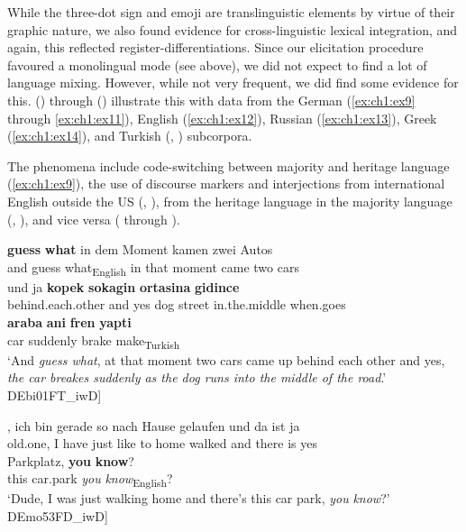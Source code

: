 \documentclass[output=paper,colorlinks,citecolor=brown]{langscibook}
\begin{document}
While the three-dot sign and emoji are translinguistic elements by virtue of their graphic nature, we also found evidence for cross-linguistic lexical integration, and again, this reflected register-differentiations. Since our elicitation procedure favoured a monolingual mode (see  above), we did not expect to find a lot of language mixing. However, while not very frequent, we did find some evidence for this. () through () illustrate this with data from the German (\ref{ex:ch1:ex9} through \ref{ex:ch1:ex11}), English (\ref{ex:ch1:ex12}), Russian (\ref{ex:ch1:ex13}), Greek (\ref{ex:ch1:ex14}), and Turkish (, ) subcorpora.

The phenomena include code-switching between majority and heritage language (\ref{ex:ch1:ex9}), the use of discourse markers and interjections from international English outside the US (, ), from the heritage language in the majority language (, ), and vice versa ( through ).

\ea\label{ex:ch1:ex9}

 {\textbf{guess}} {\textbf{what}} {in} {dem} {Moment} {kamen} {zwei} {Autos}  \\
and {guess} {what}\textsubscript{English} {in} {that} moment came two cars\\
\sn {} {und} {ja} {\textbf{kopek}} {\textbf{sokagin}} {\textbf{ortasina}} {\textbf{gidince}} \\
 behind.each.other and yes {dog} {street} {in.the.middle} {when.goes} \\
\sn \gll \textbf{{araba}} \textbf{{ani}} \textbf{{fren}} \textbf{{yapti}} \\
{car} {suddenly} {brake} {make}\textsubscript{Turkish} \\
\trans `And \textit{guess what}, at that moment two cars came up behind each other and yes, \textit{the car breakes suddenly as the dog runs into the middle of the road}.' \\ \hspace{\fill}{[}DEbi01FT\_iwD{]}

\z

\ea\label{ex:ch1:ex10}

, {ich} {bin} {gerade} {so} {nach} {Hause} {gelaufen} {und} {da} {ist} {ja}   \\
old.one, I have just like to home walked and there is yes   \\
\sn {} {Parkplatz}, \textbf{{you}} \textbf{{know}}{?} \\
this car.park \textit{you} \textit{know}\textsubscript{English}? \\
\trans ‘Dude, I was just walking home and there's this car park, \textit{you} \textit{know}?’ \\
\hspace{\fill}{[}DEmo53FD\_iwD{]}
\end{document}
